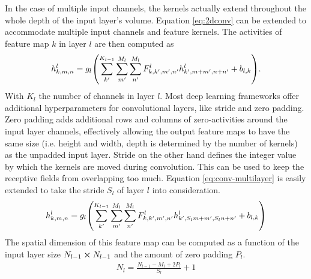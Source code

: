 In the case of multiple input channels, the kernels actually extend throughout the whole depth of the input layer's volume. Equation \ref{eq:2dconv} can be extended to accommodate multiple input channels and feature kernels. The activities of feature map $k$ in layer $l$ are then computed as
\begin{align}
    h^l_{k,m,n} = g_l\qty(\sum_{k'}^{K_{l-1}}\sum_{m'}^{M_l}\sum_{n'}^{M_l}F_{k,k',m',n'}^l h_{k',m+m',n+n'}^l+b_{l,k}).
    \label{eq:conv-multilayer}
\end{align}
With $K_l$ the number of channels in layer $l$. Most deep learning frameworks offer additional hyperparameters for convolutional layers, like stride and zero padding. Zero padding adds additional rows and columns of zero-activities around the input layer channels, effectively allowing the output feature maps to have the same size (i.e. height and width, depth is determined by the number of kernels) as the unpadded input layer. Stride on the other hand defines the integer value by which the kernels are moved during convolution. This can be used to keep the receptive fields from overlapping too much. Equation \ref{eq:conv-multilayer} is easily extended to take the stride $S_l$ of layer $l$ into consideration.
\begin{align}
    h^l_{k,m,n} = g_l\qty(\sum_{k'}^{K_{l-1}}\sum_{m'}^{M_l}\sum_{n'}^{M_l}F_{k,k',m',n'}^l h_{k',S_l m+m',S_l n+n'}^l+b_{l,k})
\end{align}
The spatial dimension of this feature map can be computed as a function of the input layer size $N_{l-1}\cp N_{l-1}$ and the amount of zero padding $P_l$.
\begin{align}
    N_l = \frac{N_{l-1}-M_l+2P_l}{S_l}+1
\end{align}
